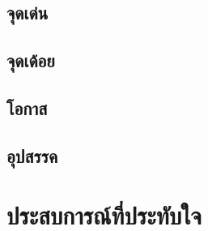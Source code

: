 \subsection{จุดเด่น}

\subsection{จุดเด้อย}

\subsection{โอกาส}

\subsection{อุปสรรค}

\section{ประสบการณ์ที่ประทับใจ}